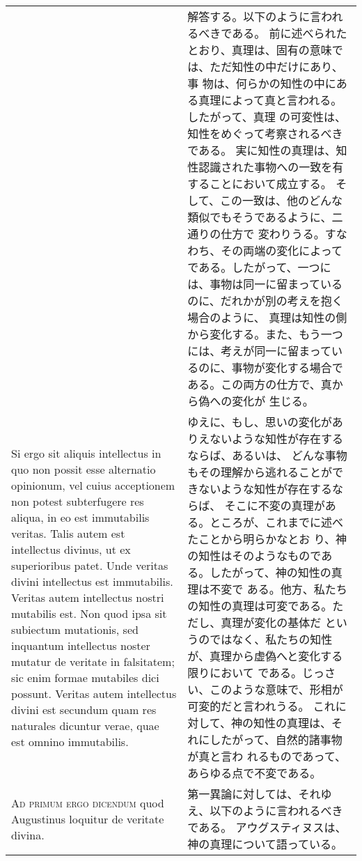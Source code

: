 \documentclass[10pt]{jsarticle} %
\begin{document}
\begin{longtable}{p{21em}p{21em}}
&

解答する。以下のように言われるべきである。
前に述べられたとおり、真理は、固有の意味では、ただ知性の中だけにあり、事
 物は、何らかの知性の中にある真理によって真と言われる。したがって、真理
 の可変性は、知性をめぐって考察されるべきである。
実に知性の真理は、知性認識された事物への一致を有することにおいて成立する。
 そして、この一致は、他のどんな類似でもそうであるように、二通りの仕方で
 変わりうる。すなわち、その両端の変化によってである。したがって、一つに
 は、事物は同一に留まっているのに、だれかが別の考えを抱く場合のように、
 真理は知性の側から変化する。また、もう一つには、考えが同一に留まってい
 るのに、事物が変化する場合である。この両方の仕方で、真から偽への変化が
 生じる。

\\

Si ergo sit
aliquis intellectus in quo non possit esse alternatio opinionum, vel
cuius acceptionem non potest subterfugere res aliqua, in eo est
immutabilis veritas. Talis autem est intellectus divinus, ut ex
superioribus patet. Unde veritas divini intellectus est
immutabilis. Veritas autem intellectus nostri mutabilis est. Non quod
ipsa sit subiectum mutationis, sed inquantum intellectus noster mutatur
de veritate in falsitatem; sic enim formae mutabiles dici
possunt. Veritas autem intellectus divini est secundum quam res
naturales dicuntur verae, quae est omnino immutabilis.


&

ゆえに、もし、思いの変化がありえないような知性が存在するならば、あるいは、
 どんな事物もその理解から逃れることができないような知性が存在するならば、
 そこに不変の真理がある。ところが、これまでに述べたことから明らかなとお
 り、神の知性はそのようなものである。したがって、神の知性の真理は不変で
 ある。他方、私たちの知性の真理は可変である。ただし、真理が変化の基体だ
 というのではなく、私たちの知性が、真理から虚偽へと変化する限りにおいて
 である。じっさい、このような意味で、形相が可変的だと言われうる。
これに対して、神の知性の真理は、それにしたがって、自然的諸事物が真と言わ
 れるものであって、あらゆる点で不変である。

\\

{\scshape Ad primum ergo dicendum} quod
Augustinus loquitur de veritate divina.

&

第一異論に対しては、それゆえ、以下のように言われるべきである。
アウグスティヌスは、神の真理について語っている。

\\



\end{longtable}
\end{document}
